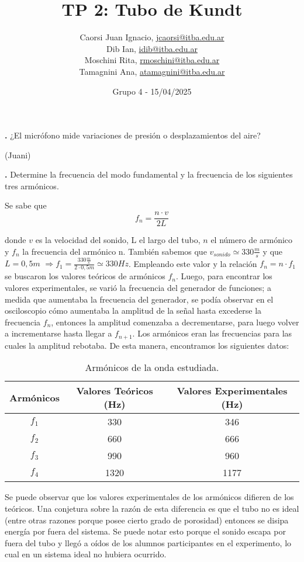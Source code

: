 \documentclass[12pt, a4paper]{article}
\title{TP 2: Tubo de Kundt}
\author
{
  Caorsi Juan Ignacio, \href{jcaorsi@itba.edu.ar}{jcaorsi@itba.edu.ar} \\
  Dib Ian, \href{idib@itba.edu.ar}{idib@itba.edu.ar} \\
  Moschini Rita, \href{rmoschini@itba.edu.ar}{rmoschini@itba.edu.ar} \\
  Tamagnini Ana, \href{atamagnini@itba.edu.ar}{atamagnini@itba.edu.ar}
}
\date{Grupo 4 - 15/04/2025}
\newcounter{step}
\newcommand{\step}[1]
{
  \par\vspace{2ex}
  \stepcounter{step}
  \noindent\textbf{\arabic{step}.} #1\par\vspace{1ex}
}
\begin{document}
\maketitle

\step{¿El micrófono mide variaciones de presión o desplazamientos del aire?}

(Juani)


\step{Determine la frecuencia del modo fundamental y la frecuencia de los siguientes tres armónicos.}

Se sabe que
\begin{equation}
    f_{n}=\frac{n\cdot v}{2L}
\end{equation}

donde $v$ es la velocidad del sonido, L el largo del tubo, $n$ el número de armónico y $f_{n}$ la frecuencia del armónico n. También sabemos que $v_{sonido}\simeq 330 \frac{m}{s}$ y que $L=0,5 m$
$\Rightarrow f_{1}=\frac{330 \frac{m}{s} }{2 \cdot 0,5m} \simeq 330 Hz $. Empleando este valor y la relación $f_{n}=n\cdot f_{1}$ se buscaron los valores teóricos de armónicos $f_{n}$. Luego, para encontrar los valores experimentales, se varió la frecuencia del generador de funciones; a medida que aumentaba la frecuencia del generador, se podía observar en el osciloscopio cómo aumentaba la amplitud de la señal hasta excederse la frecuencia $f_{n}$, entonces la amplitud comenzaba a decrementarse, para luego volver a incrementarse hasta llegar a $f_{n+1}$. Los armónicos eran las frecuencias para las cuales la amplitud rebotaba.
De esta manera, encontramos los siguientes datos:

\begin{table}[H]
    \centering
    \begin{tabular}{|c|c|c|}
    \hline
    \multirow{2}{2.1cm}{ Armónicos }
        & Valores Teóricos (Hz) & Valores Experimentales (Hz)\\
    \hline
    $f_1$  & 330  & 346 \\ \hline
    $f_2$  & 660 & 666 \\ \hline
    $f_3$  & 990 & 960 \\ \hline
    $f_4$  & 1320  & 1177 \\ \hline
    \end{tabular}
    \caption{Armónicos de la onda estudiada.}
    \label{tabla1}
\end{table}
Se puede observar que los valores experimentales de los armónicos difieren de los teóricos. Una conjetura sobre la razón de esta diferencia es que el tubo no es ideal (entre otras razones porque posee cierto grado de porosidad) entonces se disipa energía por fuera del sistema. Se puede notar esto porque el sonido escapa por fuera del tubo y llegó a oídos de los alumnos participantes en el experimento, lo cual en un sistema ideal no hubiera ocurrido.
\end{document}
